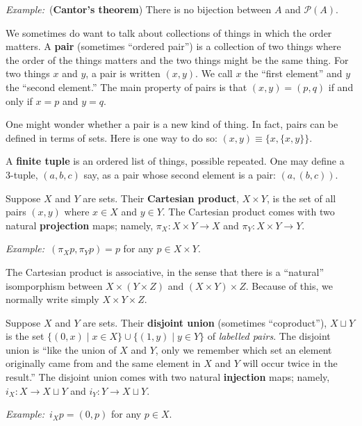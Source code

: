 \documentclass[10pt, a4paper, twocolumn]{article}
\newcommand{\defn}[1]{\textbf{\textsf{#1}}}
\newcommand{\eg}{\emph{Example:}\relax}
\begin{document}
\eg\ (\defn{Cantor's theorem}) There is no bijection between $A$ and
$\mathcal{P}(A)$.

We sometimes do want to talk about collections of things in which the
order matters. A \defn{pair} (sometimes “ordered pair”) is a
collection of two things where the order of the things matters and the
two things might be the same thing. For two things $x$ and $y$, a pair
is written $(x, y)$. We call $x$ the “first element” and $y$ the
“second element.” The main property of pairs is that $(x,y)=(p,q)$ if
and only if $x=p$ and $y=q$.

One might wonder
whether a pair is a new kind of thing. In fact, pairs can be
defined in terms of sets. Here is one way to do so: $(x, y)\equiv \{x, \{x,y\}\}$.

A \defn{finite tuple} is an ordered list of things, possible repeated. One may
define a 3-tuple, $(a, b, c)$ say, as a pair whose second element is a pair:
$(a, (b, c))$. 

Suppose $X$ and $Y$ are sets. Their \defn{Cartesian product}, $X \times Y$, is the
set of all pairs $(x, y)$ where $x \in X$ and $y \in Y$. The Cartesian product comes
with two natural \defn{projection} maps; namely, $\pi_X : X \times Y \to X$ and $\pi_Y : X
\times Y \to Y$.

\eg\ $(\pi_X p, \pi_Y p) = p$ for any $p \in X \times Y$.

The Cartesian product is associative, in the sense that there is a
``natural'' isomporphism between $X \times (Y \times Z)$ and $(X
\times Y) \times Z$. Because of this, we normally write simply $X
\times Y \times Z$.

Suppose $X$ and $Y$ are sets. Their \defn{disjoint union} (sometimes
“coproduct”), $X \sqcup Y$ is the set $\{(0, x) \mid x \in X\} \cup \{(1, y) \mid y \in Y\}$ of
\emph{labelled pairs}. The disjoint union is “like the union of $X$
and $Y$, only we remember which set an element originally came from
and the same element in $X$ and $Y$ will occur twice in the result.”
The disjoint union comes with two natural \defn{injection} maps;
namely, $i_X : X \to X \sqcup Y$ and $i_Y : Y \to X \sqcup Y$.

\eg\ $i_X p = (0, p)$ for any $p \in X$.
\end{document}
